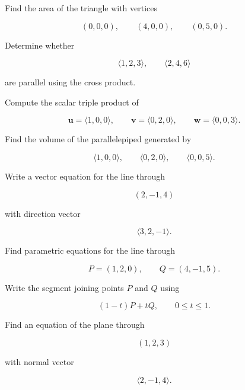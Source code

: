 \begin{exercise}[2]
Find the area of the triangle with vertices

\[ (0,0,0),\qquad(4,0,0),\qquad(0,5,0). \]
\end{exercise}

\begin{exercise}[2]
Determine whether

\[
\langle1,2,3\rangle,\qquad
\langle2,4,6\rangle
\]

are parallel using the cross product.
\end{exercise}

\begin{exercise}[2]
Compute the scalar triple product of

\[
\mathbf{u}=\langle1,0,0\rangle,\qquad
\mathbf{v}=\langle0,2,0\rangle,\qquad
\mathbf{w}=\langle0,0,3\rangle.
\]
\end{exercise}

\begin{exercise}[2]
Find the volume of the parallelepiped generated by

\[
\langle1,0,0\rangle,\qquad
\langle0,2,0\rangle,\qquad
\langle0,0,5\rangle.
\]
\end{exercise}

\begin{exercise}[2]
Write a vector equation for the line through

\[ (2,-1,4) \]

with direction vector

\[ \langle3,2,-1\rangle. \]
\end{exercise}

\begin{exercise}[2]
Find parametric equations for the line through

\[ P=(1,2,0),\qquad Q=(4,-1,5). \]
\end{exercise}

\begin{exercise}[2]
Write the segment joining points \(P\) and \(Q\) using

\[ (1-t)P+tQ,\qquad0\leq t\leq1. \]
\end{exercise}

\begin{exercise}[2]
Find an equation of the plane through

\[ (1,2,3) \]

with normal vector

\[ \langle2,-1,4\rangle. \]
\end{exercise}

